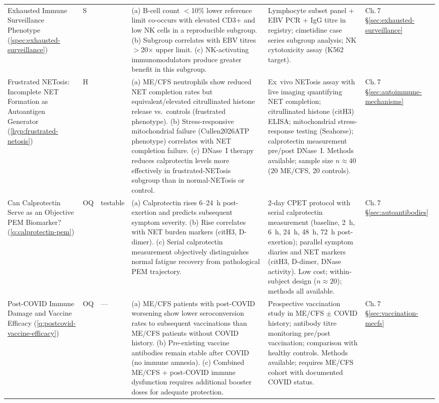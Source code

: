 \begin{longtable}{%
  p{3.0cm}
  >{\centering\arraybackslash}p{0.55cm}
  >{\centering\arraybackslash}p{1.0cm}
  p{3.8cm}
  p{3.8cm}
  p{2.2cm}
}
Exhausted Immune Surveillance Phenotype
(\ref{spec:exhausted-surveillance})
&
S & 0.35
&
(a) B-cell count $<$10\% lower reference limit co-occurs with elevated CD3+
and low NK cells in a reproducible subgroup.
(b) Subgroup correlates with EBV titres $>$20$\times$ upper limit.
(c) NK-activating immunomodulators produce greater benefit in this subgroup.
&
Lymphocyte subset panel + EBV PCR + IgG titre in registry;
cimetidine case series subgroup analysis; NK cytotoxicity assay (K562 target).
&
Ch.\,7 \S\ref{sec:exhausted-surveillance} \\[6pt]

Frustrated NETosis: Incomplete NET Formation as Autoantigen Generator
(\ref{hyp:frustrated-netosis})
&
H & 0.35
&
(a) ME/CFS neutrophils show reduced NET completion rates but equivalent/elevated
citrullinated histone release vs.\ controls (frustrated phenotype).
(b) Stress-responsive mitochondrial failure (Cullen2026ATP phenotype) correlates
with NET completion failure.
(c) DNase~I therapy reduces calprotectin levels more effectively in frustrated-NETosis
subgroup than in normal-NETosis or control.
&
Ex~vivo NETosis assay with live imaging quantifying NET completion;
citrullinated histone (citH3) ELISA; mitochondrial stress-response testing
(Seahorse); calprotectin measurement pre/post DNase~I.
Methods available; sample size $n \approx 40$ (20 ME/CFS, 20 controls).
&
Ch.\,7 \S\ref{sec:autoimmune-mechanisms} \\[6pt]

Can Calprotectin Serve as an Objective PEM Biomarker?
(\ref{q:calprotectin-pem})
&
OQ & testable
&
(a) Calprotectin rises 6--24~h post-exertion and predicts subsequent symptom severity.
(b) Rise correlates with NET burden markers (citH3, D-dimer).
(c) Serial calprotectin measurement objectively distinguishes normal fatigue recovery
from pathological PEM trajectory.
&
2-day CPET protocol with serial calprotectin measurement (baseline, 2~h, 6~h,
24~h, 48~h, 72~h post-exertion); parallel symptom diaries and NET markers
(citH3, D-dimer, DNase activity).
Low cost; within-subject design ($n \approx 20$); methods all available.
&
Ch.\,7 \S\ref{sec:autoantibodies} \\[6pt]

Post-COVID Immune Damage and Vaccine Efficacy
(\ref{q:postcovid-vaccine-efficacy})
&
OQ & ---
&
(a) ME/CFS patients with post-COVID worsening show lower seroconversion rates
to subsequent vaccinations than ME/CFS patients without COVID history.
(b) Pre-existing vaccine antibodies remain stable after COVID (no immune amnesia).
(c) Combined ME/CFS + post-COVID immune dysfunction requires additional booster
doses for adequate protection.
&
Prospective vaccination study in ME/CFS $\pm$ COVID history; antibody titre
monitoring pre/post vaccination; comparison with healthy controls.
Methods available; requires ME/CFS cohort with documented COVID status.
&
Ch.\,7 \S\ref{sec:vaccination-mecfs} \\[6pt]


\end{longtable}
